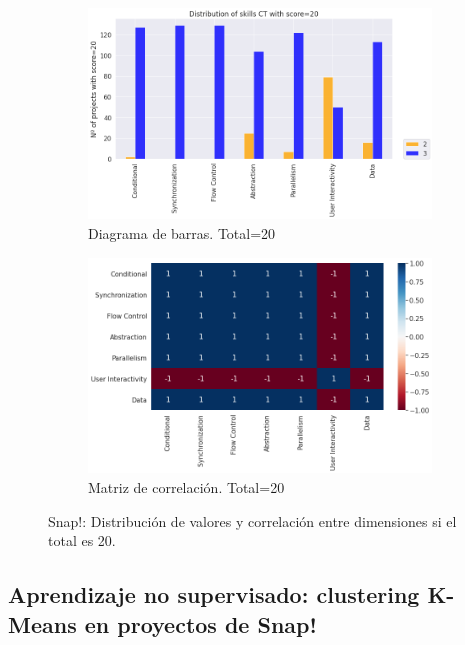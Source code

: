 \documentclass[a4paper, 12pt]{book}
\begin{document}
\begin{figure}[H]
    \centering
    \begin{subfigure}[h]{.49\textwidth} 
        \includegraphics[width=\textwidth]{img/distribucion_20_Snap}
        \caption{Diagrama de barras. Total=20}
        \label{fig:total20_Snap}
    \end{subfigure}       
    \begin{subfigure}[h]{.49\textwidth} 
        \includegraphics[width=\textwidth]{img/corr_20_Snap}
        \caption{Matriz de correlación. Total=20}
        \label{fig:corr20_Snap}
    \end{subfigure}
    \caption{Snap!: Distribución de valores y correlación entre dimensiones si el total es 20.}
\end{figure}


\subsection{Aprendizaje no supervisado: clustering K-Means en proyectos de Snap!}
\label{subsec:kmeans_Snap}
\end{document}
